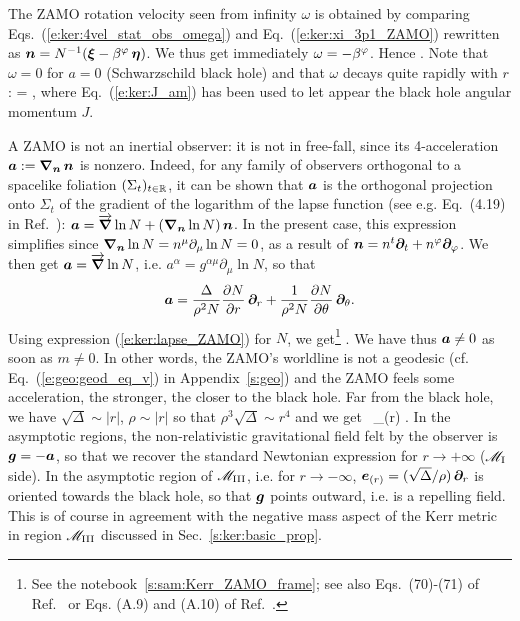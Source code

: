 The ZAMO rotation velocity seen from infinity $\omega$ is obtained
by comparing Eqs.~(\ref{e:ker:4vel_stat_obs_omega}) and Eq.~(\ref{e:ker:xi_3p1_ZAMO})
rewritten as $\bm{n} = N^{-1}(\bm{\xi} - \beta^\varphi \, \bm{\eta})$. We thus get
immediately $\omega = - \beta^\varphi$. Hence
\be \label{e:ker:omega_ZAMO}
    .
\ee
Note that $\omega = 0$ for $a=0$ (Schwarzschild black hole) and that $\omega$
decays quite rapidly with $r$:
\be \label{e:ker:omega_ZAMO_asymp}
    \omega {}  =  ,
\ee
where Eq.~(\ref{e:ker:J_am}) has been used to let appear the black hole angular momentum $J$.

A ZAMO is not an inertial observer: it is not in free-fall, since its 4-acceleration $\bm{a} := \bm{\nabla}_{\bm{n}}\, \bm{n}$
is nonzero. Indeed, for any family of observers orthogonal to a spacelike foliation $(\Sigma_t)_{t\in\mathbb{R}}$,
it can be shown that $\bm{a}$ is the orthogonal projection onto $\Sigma_t$ of
the gradient of the logarithm of the lapse function (see e.g. Eq.~(4.19) in Ref.~\cite{Gourg12}):
$\bm{a} = \overrightarrow{\bm{\nabla}}\ln N + (\bm{\nabla}_{\bm{n}} \ln N)\, \bm{n}$. In the present case, this expression
simplifies since $\bm{\nabla}_{\bm{n}} \ln N = n^\mu \partial_\mu \ln N = 0$, as a result of $\bm{n} = n^t \bm{\partial}_t + n^\varphi \bm{\partial}_\varphi$. We then get $\bm{a} = \overrightarrow{\bm{\nabla}}\ln N$, i.e.
$a^\alpha = g^{\alpha\mu}\partial_\mu \ln N$, so that
\[
    \bm{a} = \frac{\Delta}{\rho^2 N} \frac{\partial N}{\partial r} \, \bm{\partial}_r +
        \frac{1}{\rho^2 N} \frac{\partial N}{\partial \theta} \, \bm{\partial}_\theta.
\]
Using expression (\ref{e:ker:lapse_ZAMO}) for $N$, we get\footnote{See the
notebook~\ref{s:sam:Kerr_ZAMO_frame}; see also
Eqs.~(70)-(71) of Ref.~\cite{Semer93} or Eqs. (A.9) and (A.10) of Ref.~\cite{BiniGJ17}.}
\be \label{e:ker:acc_ZAMO}
   .
\ee
We have thus $\bm{a}\neq 0$ as soon as $m\neq 0$. In other words, the
ZAMO's worldline is not a geodesic (cf. Eq.~(\ref{e:geo:geod_eq_v}) in Appendix~\ref{s:geo}) and
the ZAMO feels some acceleration, the stronger, the closer to the black hole.
Far from the black hole, we have $\sqrt{\Delta} \sim |r|$, $\rho\sim |r|$ so that
$\rho^3\sqrt{\Delta} \sim r^4$ and we get
\be \label{e:ker:acc_ZAMO_asymp}
      \, _{(r)} .
\ee
In the asymptotic regions, the non-relativistic gravitational field felt by the observer
is $\bm{g} = - \bm{a}$, so that we recover the standard Newtonian expression
for $r\to +\infty$ ($\mathscr{M}_{\rm I}$ side). In the asymptotic region of $\mathscr{M}_{\rm III}$, i.e.
for $r\to -\infty$, $\bm{e}_{(r)} = (\sqrt{\Delta}/\rho)\, \bm{\partial}_r$ is oriented towards
the black hole, so that $\bm{g}$ points outward, i.e. is a repelling field.
This is of course in agreement with the negative mass aspect of the Kerr metric in region $\mathscr{M}_{\rm III}$
 discussed in Sec.~\ref{s:ker:basic_prop}.



